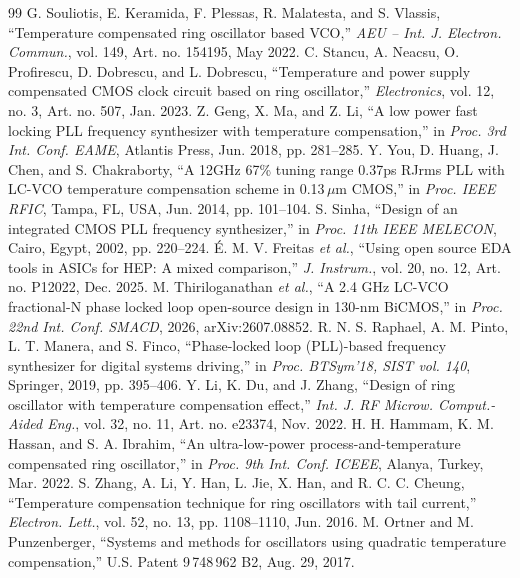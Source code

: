 \documentclass[11pt,a4paper]{article}
\begin{document}
\begin{thebibliography}{99}\small
{} G. Souliotis, E. Keramida, F. Plessas, R. Malatesta, and S. Vlassis, ``Temperature compensated ring oscillator based VCO,'' \emph{AEU -- Int. J. Electron. Commun.}, vol. 149, Art. no. 154195, May 2022.
 C. Stancu, A. Neacsu, O. Profirescu, D. Dobrescu, and L. Dobrescu, ``Temperature and power supply compensated CMOS clock circuit based on ring oscillator,'' \emph{Electronics}, vol. 12, no. 3, Art. no. 507, Jan. 2023.
 Z. Geng, X. Ma, and Z. Li, ``A low power fast locking PLL frequency synthesizer with temperature compensation,'' in \emph{Proc. 3rd Int. Conf. EAME}, Atlantis Press, Jun. 2018, pp. 281--285.
 Y. You, D. Huang, J. Chen, and S. Chakraborty, ``A 12GHz 67\% tuning range 0.37ps RJrms PLL with LC-VCO temperature compensation scheme in 0.13\,$\mu$m CMOS,'' in \emph{Proc. IEEE RFIC}, Tampa, FL, USA, Jun. 2014, pp. 101--104.
 S. Sinha, ``Design of an integrated CMOS PLL frequency synthesizer,'' in \emph{Proc. 11th IEEE MELECON}, Cairo, Egypt, 2002, pp. 220--224.
 \'E. M. V. Freitas \emph{et al.}, ``Using open source EDA tools in ASICs for HEP: A mixed comparison,'' \emph{J. Instrum.}, vol. 20, no. 12, Art. no. P12022, Dec. 2025.
 M. Thiriloganathan \emph{et al.}, ``A 2.4 GHz LC-VCO fractional-N phase locked loop open-source design in 130-nm BiCMOS,'' in \emph{Proc. 22nd Int. Conf. SMACD}, 2026, arXiv:2607.08852.
 R. N. S. Raphael, A. M. Pinto, L. T. Manera, and S. Finco, ``Phase-locked loop (PLL)-based frequency synthesizer for digital systems driving,'' in \emph{Proc. BTSym'18, SIST vol. 140}, Springer, 2019, pp. 395--406.
 Y. Li, K. Du, and J. Zhang, ``Design of ring oscillator with temperature compensation effect,'' \emph{Int. J. RF Microw. Comput.-Aided Eng.}, vol. 32, no. 11, Art. no. e23374, Nov. 2022.
 H. H. Hammam, K. M. Hassan, and S. A. Ibrahim, ``An ultra-low-power process-and-temperature compensated ring oscillator,'' in \emph{Proc. 9th Int. Conf. ICEEE}, Alanya, Turkey, Mar. 2022.
 S. Zhang, A. Li, Y. Han, L. Jie, X. Han, and R. C. C. Cheung, ``Temperature compensation technique for ring oscillators with tail current,'' \emph{Electron. Lett.}, vol. 52, no. 13, pp. 1108--1110, Jun. 2016.
 M. Ortner and M. Punzenberger, ``Systems and methods for oscillators using quadratic temperature compensation,'' U.S. Patent 9\,748\,962 B2, Aug. 29, 2017.

\end{thebibliography}
\end{document}
